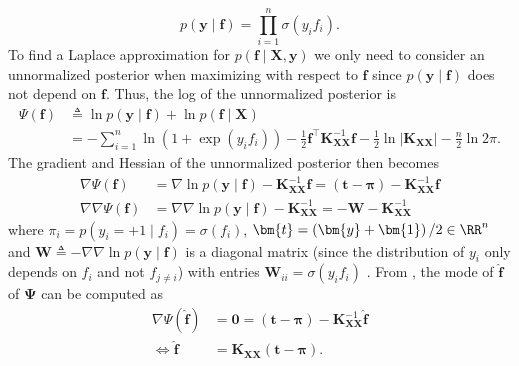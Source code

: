 \begin{equation*}
    p \left( \bm{y} \mid \bm{f} \right) = \prod_{i=1}^{n} \sigma \left( y_i f_i \right).
\end{equation*}
To find a Laplace approximation for $p \left( \bm{f} \mid \bm{X} , \bm{y} \right)$ we only need to consider an unnormalized posterior when maximizing with respect to $\bm{f}$ since $p \left( \bm{y} \mid \bm{f} \right)$ does not depend on $\bm{f}$. Thus, the log of the unnormalized posterior is
\begin{align*}
    \Psi \left( \bm{f} \right)
     & \triangleq \ln p \left( \bm{y} \mid \bm{f} \right) + \ln p \left( \bm{f} \mid \bm{X} \right)                                                                                                                                \\
     & = - \sum_{i=1}^{n} \ln \left( 1 + \exp \left( y_i f_i \right) \right) - \frac{1}{2} \bm{f}^{\intercal} \bm{K}_{\bm{X} \bm{X}}^{-1} \bm{f} - \frac{1}{2} \ln \left| \bm{K}_{\bm{X} \bm{X}} \right| - \frac{n}{2} \ln 2 \pi .
\end{align*}
The gradient and Hessian of the unnormalized posterior then becomes
\begin{align*}
    \nabla \Psi \left( \bm{f} \right)        & = \nabla \ln p \left( \bm{y} \mid \bm{f} \right) - \bm{K}_{\bm{X} \bm{X}}^{-1} \bm{f} = \left( \bm{t} - \bm{\pi} \right) - \bm{K}_{\bm{X} \bm{X}}^{-1} \bm{f} \\
    \nabla \nabla \Psi \left( \bm{f} \right) & = \nabla \nabla \ln p \left( \bm{y} \mid \bm{f} \right) - \bm{K}_{\bm{X} \bm{X}}^{-1} = - \bm{W} - \bm{K}_{\bm{X} \bm{X}}^{-1}
\end{align*}
where $\pi_i = p \left( y_i = +1 \mid f_i \right) = \sigma ( f_i )$, $\bm{t} = \left( \bm{y} + \bm{1} \right) / 2 \in \RR^{n}$ and $\bm{W} \triangleq - \nabla \nabla \ln p \left( \bm{y} \mid \bm{f} \right)$ is a diagonal matrix (since the distribution of $y_i$ only depends on $f_i$ and not $f_{j \neq i}$) with entries $\bm{W}_{ii} = \sigma \left( y_i f_i \right)$ \cite{BishopChristopherM2006Pram, RasmussenCarlEdward2006Gpfm}. From , the mode of $\hat{\bm{f}}$ of $\bm{\Psi}$ can be computed as
\begin{align}
    \nabla \Psi \left( \hat{\bm{f}} \right) & = \bm{0} = \left( \bm{t} - \bm{\pi} \right) - \bm{K}_{\bm{X} \bm{X}}^{-1} \hat{\bm{f}} \nonumber \\
    \iff \hat{\bm{f}}                       & = \bm{K}_{\bm{X} \bm{X}} \left( \bm{t} - \bm{\pi} \right) \label{eq: expr-for-mode-lapace} .
\end{align}
